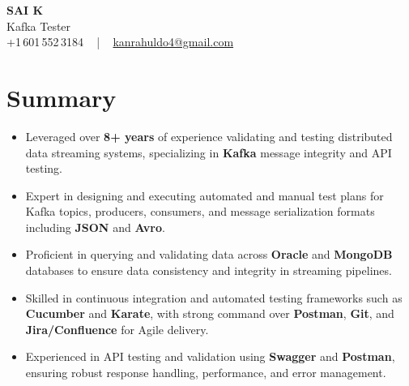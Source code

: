 \documentclass[letterpaper,11pt]{article}
\newcommand{\resumeItem}[1]{
  \item\footnotesize{
    {#1 \vspace{-2pt}}
  }
}
\newcommand{\resumeItemListStart}{\begin{itemize}[leftmargin=*]}
\newcommand{\resumeItemListEnd}{\end{itemize}\vspace{-5pt}}
\begin{document}
\begin{center}
    {\fontsize{14pt}{12pt}\selectfont \textbf{\MakeUppercase{Sai K}}}\\ \vspace{2pt}
    \fontsize{10pt}{12pt}\selectfont Kafka Tester\\ \vspace{2pt}
    \fontsize{10pt}{12pt}\selectfont +1\,601\,552\,3184 ~ | ~
    \href{mailto:kanrahuldo4@gmail.com}{kanrahuldo4@gmail.com}
    \vspace{-10pt}
\end{center}

\section{Summary}
\fontsize{9pt}{10pt}\selectfont
\resumeItemListStart
  \resumeItem{Leveraged over \textbf{8+ years} of experience validating and testing distributed data streaming systems, specializing in \textbf{Kafka} message integrity and API testing.}
  \resumeItem{Expert in designing and executing automated and manual test plans for Kafka topics, producers, consumers, and message serialization formats including \textbf{JSON} and \textbf{Avro}.}
  \resumeItem{Proficient in querying and validating data across \textbf{Oracle} and \textbf{MongoDB} databases to ensure data consistency and integrity in streaming pipelines.}
  \resumeItem{Skilled in continuous integration and automated testing frameworks such as \textbf{Cucumber} and \textbf{Karate}, with strong command over \textbf{Postman}, \textbf{Git}, and \textbf{Jira/Confluence} for Agile delivery.}
  \resumeItem{Experienced in API testing and validation using \textbf{Swagger} and \textbf{Postman}, ensuring robust response handling, performance, and error management.}
\resumeItemListEnd
\vspace{-6pt}

\end{document}
